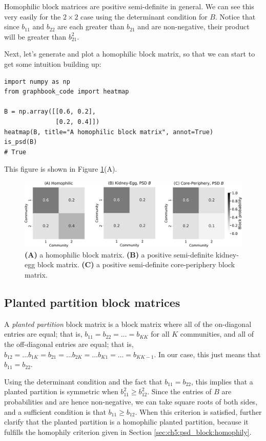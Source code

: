 Homophilic block matrices are positive semi-definite in general. We can see this very easily for the $2 \times 2$ case using the determinant condition for $B$. Notice that since $b_{11}$ and $b_{22}$ are each greater than $b_{21}$ and are non-negative, their product will be greater than $b_{21}^2$. 

Next, let's generate and plot a homophilic block matrix, so that we can start to get some intuition building up:

\begin{lstlisting}[style=python]
import numpy as np
from graphbook_code import heatmap

B = np.array([[0.6, 0.2], 
              [0.2, 0.4]])
heatmap(B, title="A homophilic block matrix", annot=True)
is_psd(B)
# True
\end{lstlisting}

This figure is shown in Figure \ref{fig:ch5:psd_bmtx}(A).

\begin{figure}[h]
    \centering
    \includegraphics[width=\linewidth]{representations/ch5/Images/psd.png}
    \caption[PSD block matrices]{\textbf{(A)} a homophilic block matrix. \textbf{(B)} a positive semi-definite kidney-egg block matrix. \textbf{(C)} a positive semi-definite core-periphery block matrix.}
    \label{fig:ch5:psd_bmtx}
\end{figure}

\subsection{Planted partition block matrices}

A \textit{planted partition} block matrix is a block matrix where all of the on-diagonal entries are equal; that is, $b_{11} = b_{22} = \hdots = b_{KK}$ for all $K$ communities, and all of the off-diagonal entries are equal; that is, $b_{12} = \hdots b_{1K} = b_{21} = \hdots b_{2K} = \hdots b_{K1} = \hdots = b_{KK-1}$. In our case, this just means that $b_{11} = b_{22}$. 

Using the determinant condition and the fact that $b_{11} = b_{22}$, this implies that a planted partition is symmetric when $b_{11}^2 \geq b_{12}^2$. Since the entries of $B$ are probabilities and are hence non-negative, we can take square roots of both sides, and a sufficient condition is that $b_{11} \geq b_{12}$. When this criterion is satisfied, further clarify that the planted partition is a homophilic planted partition, because it fulfills the homophily criterion given in Section \ref{sec:ch5:psd_block:homophily}. 


